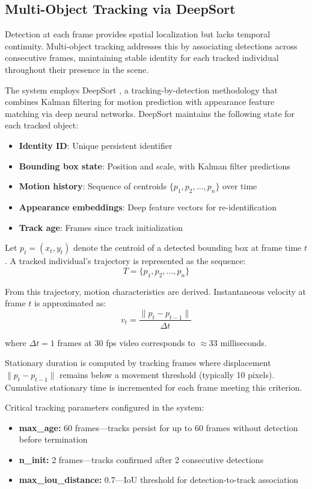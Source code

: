 \documentclass[conference]{IEEEtran}
\begin{document}
\subsection{Multi-Object Tracking via DeepSort}

Detection at each frame provides spatial localization but lacks temporal continuity. Multi-object tracking addresses this by associating detections across consecutive frames, maintaining stable identity for each tracked individual throughout their presence in the scene.

The system employs DeepSort \cite{ref20}, a tracking-by-detection methodology that combines Kalman filtering for motion prediction with appearance feature matching via deep neural networks. DeepSort maintains the following state for each tracked object:

\begin{itemize}
\item \textbf{Identity ID}: Unique persistent identifier
\item \textbf{Bounding box state}: Position and scale, with Kalman filter predictions
\item \textbf{Motion history}: Sequence of centroids $\{p_1, p_2, \ldots, p_n\}$ over time
\item \textbf{Appearance embeddings}: Deep feature vectors for re-identification
\item \textbf{Track age}: Frames since track initialization
\end{itemize}

Let $p_t = (x_t, y_t)$ denote the centroid of a detected bounding box at frame time $t$. A tracked individual's trajectory is represented as the sequence:
\[
T = \{p_1, p_2, \ldots, p_n\}
\]

From this trajectory, motion characteristics are derived. Instantaneous velocity at frame $t$ is approximated as:
\[
v_t = \frac{\|p_t - p_{t-1}\|}{\Delta t}
\]

where $\Delta t = 1$ frames at 30 fps video corresponds to $\approx 33$ milliseconds.

Stationary duration is computed by tracking frames where displacement $\|p_t - p_{t-1}\|$ remains below a movement threshold (typically 10 pixels). Cumulative stationary time is incremented for each frame meeting this criterion.

Critical tracking parameters configured in the system:
\begin{itemize}
\item \textbf{max\_age:} 60 frames—tracks persist for up to 60 frames without detection before termination
\item \textbf{n\_init:} 2 frames—tracks confirmed after 2 consecutive detections
\item \textbf{max\_iou\_distance:} 0.7—IoU threshold for detection-to-track association
\end{itemize}
\end{document}
